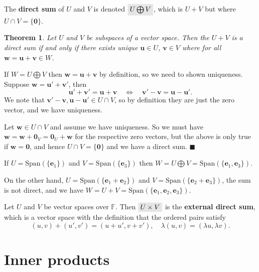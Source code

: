 \documentclass[letter-paper]{tufte-book}
\newtheorem{theorem}{\color{pastel-blue}Theorem}[section]
\newenvironment{proof}[1][Proof]{\begin{trivlist}
\item[\hskip \labelsep {\bfseries #1}]}{\end{trivlist}}
\newenvironment{example}[1][Example]{\begin{trivlist}
\item[\hskip \labelsep {\bfseries #1}]}{\end{trivlist}}
\newcommand{\Ob}{{\boldsymbol{0}}}
\newcommand{\eb}{{\boldsymbol{e}}}
\newcommand{\ub}{{\boldsymbol{u}}}
\newcommand{\vb}{{\boldsymbol{v}}}
\newcommand{\wb}{{\boldsymbol{w}}}
\newcommand{\qed}{\hfill$\blacksquare$}
\newcommand{\highlight}[1]{\mathchoice%
  {\colorbox{black!10}{$\displaystyle#1$}}%
  {\colorbox{black!10}{$\textstyle#1$}}%
  {\colorbox{black!10}{$\scriptstyle#1$}}%
  {\colorbox{black!10}{$\scriptscriptstyle#1$}}}%
\begin{document}
The \textbf{direct sum} of $U$ and $V$ is denoted $\highlight{U \bigoplus V}$, which is $U + V$ but where $U \cap V = \{\Ob\}$.

\begin{theorem}
  Let $U$ and $V$ be subspaces of a vector space. Then the $U + V$ is a direct sum if and only if there exists unique $\ub \in U$, $\vb \in V$ where for all $\wb = \ub + \vb \in W$.
\end{theorem}

\begin{proof}
  If $W = U \bigoplus V$ then $\wb = \ub + \vb$ by definition, so we need to shown uniqueness. Suppose $\wb = \ub' + \vb'$, then
  \begin{equation*}
    \ub' + \vb' = \ub + \vb \quad \Leftrightarrow \quad \vb' - \vb = \ub - \ub'.
  \end{equation*}
  We note that $\vb' - \vb, \ub - \ub' \in U \cap V$, so by definition they are just the zero vector, and we have uniqueness.
  
  Let $\wb \in U \cap V$ and assume we have uniqueness. So we must have $\wb = \wb + \Ob_V = \Ob_U + \wb$ for the respective zero vectors, but the above is only true if $\wb = \Ob$, and hence $U \cap V = \{\Ob\}$ and we have a direct sum. \qed
\end{proof}

\begin{example}
  If $U = \mbox{Span}(\{\eb_1\})$ and $V = \mbox{Span}(\{\eb_3\})$ then $W = U \bigoplus V = \mbox{Span}(\{\eb_1, \eb_3\})$.
  
  On the other hand, $U = \mbox{Span}(\{\eb_1 + \eb_2\})$ and $V = \mbox{Span}(\{\eb_2 + \eb_3\})$, the sum is not direct, and we have $W = U + V = \mbox{Span}(\{\eb_1, \eb_2, \eb_3\})$.
\end{example}

Let $U$ and $V$ be vector spaces over $\mathbb{F}$. Then $\highlight{U \times V}$ is the \textbf{external direct sum}, which is a vector space with the definition that the ordered pairs satisfy
\begin{equation*}
  (u, v) + (u', v') = (u + u', v + v'), \quad \lambda(u, v) = (\lambda u, \lambda v).
\end{equation*}


\section{Inner products}
\end{document}
